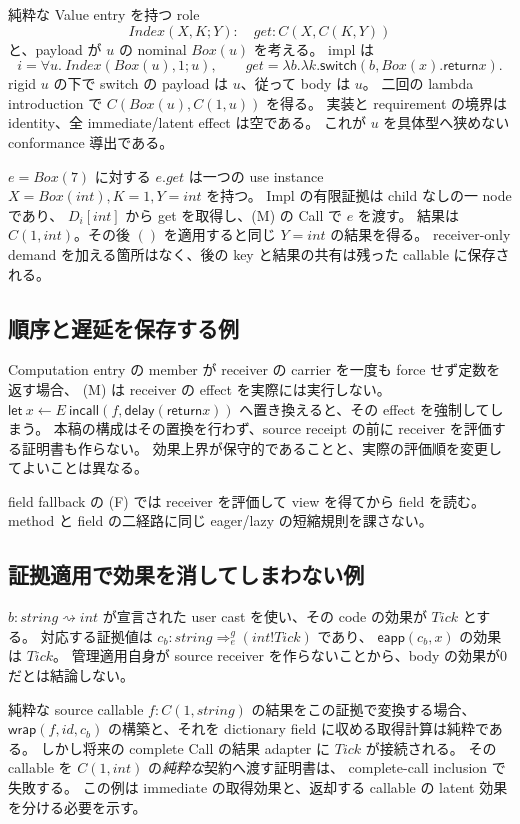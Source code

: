 \documentclass[11pt,a4paper]{article}
\newcommand{\Ret}{\mathsf{return}}
\newcommand{\Call}{\mathsf{call}}
\newcommand{\Delay}{\mathsf{delay}}
\newcommand{\Wrap}{\mathsf{wrap}}
\newcommand{\Dir}{\mathrel{\rightsquigarrow}}
\begin{document}
純粋な Value entry を持つ role
\[
 Index(X,K;Y):\quad get:C(X,C(K,Y))
\]
と、payload が \(u\) の nominal \(Box(u)\) を考える。
impl は
\[
 i=\forall u.\ Index(Box(u),1;u),\qquad
 get=\lambda b.\lambda k.\mathsf{switch}(b,Box(x).\Ret x).
\]
rigid \(u\) の下で switch の payload は \(u\)、従って body は \(u\)。
二回の lambda introduction で \(C(Box(u),C(1,u))\) を得る。
実装と requirement の境界は identity、全 immediate/latent effect は空である。
これが \(u\) を具体型へ狭めない conformance 導出である。

\(e=Box(7)\) に対する \(e.get\) は一つの use instance
\(X=Box(int),K=1,Y=int\) を持つ。
Impl の有限証拠は child なしの一 node であり、
\(D_i[int]\) から get を取得し、(M) の Call で \(e\) を渡す。
結果は \(C(1,int)\)。その後 \(()\) を適用すると同じ \(Y=int\) の結果を得る。
receiver-only demand を加える箇所はなく、後の key と結果の共有は残った callable に保存される。

\subsection{順序と遅延を保存する例}

Computation entry の member が receiver の carrier を一度も force せず定数を返す場合、
(M) は receiver の effect を実際には実行しない。
\(\mathsf{let}\ x\leftarrow E\ \mathsf{in}\Call(f,\Delay(\Ret x))\)
へ置き換えると、その effect を強制してしまう。
本稿の構成はその置換を行わず、source receipt の前に receiver を評価する証明書も作らない。
効果上界が保守的であることと、実際の評価順を変更してよいことは異なる。

field fallback の (F) では receiver を評価して view を得てから field を読む。
method と field の二経路に同じ eager/lazy の短縮規則を課さない。

\subsection{証拠適用で効果を消してしまわない例}

\(b:string\Dir int\) が宣言された user cast を使い、その code の効果が \(Tick\) とする。
対応する証拠値は
\(c_b:string\Rightarrow_e^g(int!Tick)\) であり、
\(\mathsf{eapp}(c_b,x)\) の効果は \(Tick\)。
管理適用自身が source receiver を作らないことから、body の効果が0だとは結論しない。

純粋な source callable \(f:C(1,string)\) の結果をこの証拠で変換する場合、
\(\Wrap(f,id,c_b)\) の構築と、それを dictionary field に収める取得計算は純粋である。
しかし将来の complete Call の結果 adapter に \(Tick\) が接続される。
その callable を \(C(1,int)\) の\emph{純粋な}契約へ渡す証明書は、
complete-call inclusion で失敗する。
この例は immediate の取得効果と、返却する callable の latent 効果を分ける必要を示す。
\end{document}
